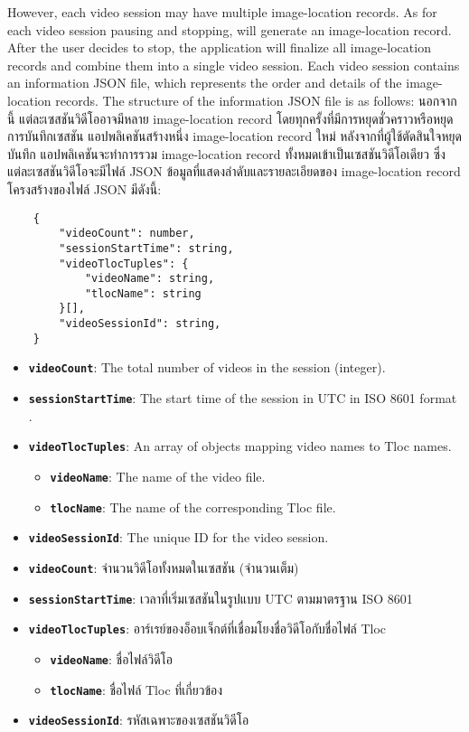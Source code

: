 \ifenglish
However, each video session may have multiple image-location records. As for each video session pausing and stopping, will generate an image-location record. After the user decides to stop, the application will finalize all image-location records and combine them into a single video session. Each video session contains an information JSON file, which represents the order and details of the image-location records. The structure of the information JSON file is as follows:
\else
นอกจากนี้ แต่ละเซสชันวิดีโออาจมีหลาย image-location record โดยทุกครั้งที่มีการหยุดชั่วคราวหรือหยุดการบันทึกเซสชัน แอปพลิเคชันสร้างหนึ่ง image-location record ใหม่ หลังจากที่ผู้ใช้ตัดสินใจหยุดบันทึก แอปพลิเคชันจะทำการรวม image-location record ทั้งหมดเข้าเป็นเซสชันวิดีโอเดียว ซึ่งแต่ละเซสชันวิดีโอจะมีไฟล์ JSON ข้อมูลที่แสดงลำดับและรายละเอียดของ image-location record โครงสร้างของไฟล์ JSON มีดังนี้:
\fi

\begin{lstlisting}
    {
        "videoCount": number,
        "sessionStartTime": string,
        "videoTlocTuples": {
            "videoName": string, 
            "tlocName": string 
        }[],
        "videoSessionId": string,
    }
\end{lstlisting}

\ifenglish
\begin{itemize}
    \item \textbf{\texttt{videoCount}}: The total number of videos in the session (integer).
    \item \textbf{\texttt{sessionStartTime}}: The start time of the session in UTC in ISO 8601 format \cite{iso8601}.
    \item \textbf{\texttt{videoTlocTuples}}: An array of objects mapping video names to Tloc names.
    \begin{itemize}
        \item \textbf{\texttt{videoName}}: The name of the video file.
        \item \textbf{\texttt{tlocName}}: The name of the corresponding Tloc file.
    \end{itemize}
    \item \textbf{\texttt{videoSessionId}}: The unique ID for the video session.
\end{itemize}
\else
\begin{itemize}
    \item \textbf{\texttt{videoCount}}: จำนวนวิดีโอทั้งหมดในเซสชัน (จำนวนเต็ม)
    \item \textbf{\texttt{sessionStartTime}}: เวลาที่เริ่มเซสชันในรูปแบบ UTC ตามมาตรฐาน ISO 8601 \cite{iso8601}
    \item \textbf{\texttt{videoTlocTuples}}: อาร์เรย์ของอ็อบเจ็กต์ที่เชื่อมโยงชื่อวิดีโอกับชื่อไฟล์ Tloc
    \begin{itemize}
        \item \textbf{\texttt{videoName}}: ชื่อไฟล์วิดีโอ
        \item \textbf{\texttt{tlocName}}: ชื่อไฟล์ Tloc ที่เกี่ยวข้อง
    \end{itemize}
    \item \textbf{\texttt{videoSessionId}}: รหัสเฉพาะของเซสชันวิดีโอ
\end{itemize}
\fi

